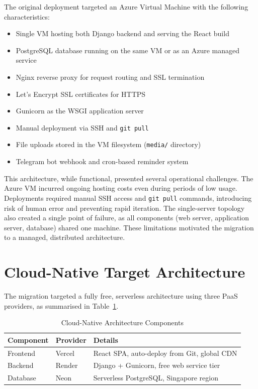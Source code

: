 \documentclass[conference]{IEEEtran}
\begin{document}
The original deployment targeted an Azure Virtual Machine with the following characteristics:

\begin{itemize}
    \item Single VM hosting both Django backend and serving the React build
    \item PostgreSQL database running on the same VM or as an Azure managed service
    \item Nginx reverse proxy for request routing and SSL termination
    \item Let's Encrypt SSL certificates for HTTPS
    \item Gunicorn as the WSGI application server
    \item Manual deployment via SSH and \texttt{git pull}
    \item File uploads stored in the VM filesystem (\texttt{media/} directory)
    \item Telegram bot webhook and cron-based reminder system
\end{itemize}

This architecture, while functional, presented several operational challenges. The Azure VM incurred ongoing hosting costs even during periods of low usage. Deployments required manual SSH access and \texttt{git pull} commands, introducing risk of human error and preventing rapid iteration. The single-server topology also created a single point of failure, as all components (web server, application server, database) shared one machine. These limitations motivated the migration to a managed, distributed architecture.

\section{Cloud-Native Target Architecture}

The migration targeted a fully free, serverless architecture using three PaaS providers, as summarised in Table~\ref{tab:architecture}.

\begin{table}[H]
\centering
\caption{Cloud-Native Architecture Components}
\label{tab:architecture}
\begin{tabular}{@{}p{1.8cm}p{1.8cm}p{3.8cm}@{}}
\toprule
\textbf{Component} & \textbf{Provider} & \textbf{Details} \\
\midrule
Frontend & Vercel & React SPA, auto-deploy from Git, global CDN \\
Backend & Render & Django + Gunicorn, free web service tier \\
Database & Neon & Serverless PostgreSQL, Singapore region \\
\bottomrule
\end{tabular}
\end{table}
\end{document}
